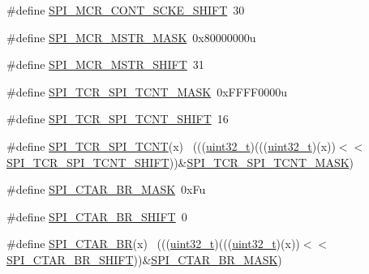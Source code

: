 \begin{DoxyCompactItemize}
\item 
\#define \hyperlink{group___s_p_i___register___masks_ga57c862186e43a26823716267bfadd92f}{S\+P\+I\+\_\+\+M\+C\+R\+\_\+\+C\+O\+N\+T\+\_\+\+S\+C\+K\+E\+\_\+\+S\+H\+I\+FT}~30
\item 
\#define \hyperlink{group___s_p_i___register___masks_gaa201344af736c83618497329b6529f04}{S\+P\+I\+\_\+\+M\+C\+R\+\_\+\+M\+S\+T\+R\+\_\+\+M\+A\+SK}~0x80000000u
\item 
\#define \hyperlink{group___s_p_i___register___masks_ga7118ec0360c840ddef7e666831cb13fb}{S\+P\+I\+\_\+\+M\+C\+R\+\_\+\+M\+S\+T\+R\+\_\+\+S\+H\+I\+FT}~31
\item 
\#define \hyperlink{group___s_p_i___register___masks_ga3b9bdb39b00af35d3f731123bc82d143}{S\+P\+I\+\_\+\+T\+C\+R\+\_\+\+S\+P\+I\+\_\+\+T\+C\+N\+T\+\_\+\+M\+A\+SK}~0x\+F\+F\+F\+F0000u
\item 
\#define \hyperlink{group___s_p_i___register___masks_ga4ac4f90bab2c1a761f439f50bcdca71f}{S\+P\+I\+\_\+\+T\+C\+R\+\_\+\+S\+P\+I\+\_\+\+T\+C\+N\+T\+\_\+\+S\+H\+I\+FT}~16
\item 
\#define \hyperlink{group___s_p_i___register___masks_ga83680010e4109df987bbfef6eb96460e}{S\+P\+I\+\_\+\+T\+C\+R\+\_\+\+S\+P\+I\+\_\+\+T\+C\+NT}(x)                                        ~(((\hyperlink{_p_e___types_8h_a33594304e786b158f3fb30289278f5af}{uint32\+\_\+t})(((\hyperlink{_p_e___types_8h_a33594304e786b158f3fb30289278f5af}{uint32\+\_\+t})(x))$<$$<$\hyperlink{group___s_p_i___register___masks_ga4ac4f90bab2c1a761f439f50bcdca71f}{S\+P\+I\+\_\+\+T\+C\+R\+\_\+\+S\+P\+I\+\_\+\+T\+C\+N\+T\+\_\+\+S\+H\+I\+FT}))\&\hyperlink{group___s_p_i___register___masks_ga3b9bdb39b00af35d3f731123bc82d143}{S\+P\+I\+\_\+\+T\+C\+R\+\_\+\+S\+P\+I\+\_\+\+T\+C\+N\+T\+\_\+\+M\+A\+SK})
\item 
\#define \hyperlink{group___s_p_i___register___masks_gad1ba5817c825831950fc73cc726f0737}{S\+P\+I\+\_\+\+C\+T\+A\+R\+\_\+\+B\+R\+\_\+\+M\+A\+SK}~0x\+Fu
\item 
\#define \hyperlink{group___s_p_i___register___masks_gad988143e0be530acb59dca0fad52ec0b}{S\+P\+I\+\_\+\+C\+T\+A\+R\+\_\+\+B\+R\+\_\+\+S\+H\+I\+FT}~0
\item 
\#define \hyperlink{group___s_p_i___register___masks_ga154db9f43556d80df49777de0644e296}{S\+P\+I\+\_\+\+C\+T\+A\+R\+\_\+\+BR}(x)                                                  ~(((\hyperlink{_p_e___types_8h_a33594304e786b158f3fb30289278f5af}{uint32\+\_\+t})(((\hyperlink{_p_e___types_8h_a33594304e786b158f3fb30289278f5af}{uint32\+\_\+t})(x))$<$$<$\hyperlink{group___s_p_i___register___masks_gad988143e0be530acb59dca0fad52ec0b}{S\+P\+I\+\_\+\+C\+T\+A\+R\+\_\+\+B\+R\+\_\+\+S\+H\+I\+FT}))\&\hyperlink{group___s_p_i___register___masks_gad1ba5817c825831950fc73cc726f0737}{S\+P\+I\+\_\+\+C\+T\+A\+R\+\_\+\+B\+R\+\_\+\+M\+A\+SK})

\end{DoxyCompactItemize}
